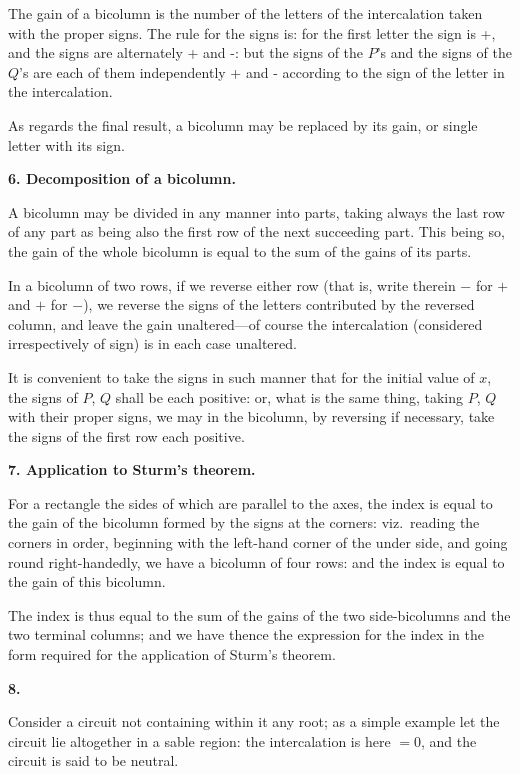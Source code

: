 \documentclass[12pt,a4paper]{article}
\theoremstyle{plain}
\theoremstyle{definition}
\begin{document}
The gain of a bicolumn is the number of the letters of the intercalation taken with the proper signs. The rule for the signs is: for the first letter the sign is +, and the signs are alternately + and -: but the signs of the $P$'s and the signs of the $Q$'s are each of them independently + and - according to the sign of the letter in the intercalation.

As regards the final result, a bicolumn may be replaced by its gain, or single letter with its sign.

\textbf{6. Decomposition of a bicolumn.}

A bicolumn may be divided in any manner into parts, taking always the last row of any part as being also the first row of the next succeeding part. This being so, the gain of the whole bicolumn is equal to the sum of the gains of its parts.

In a bicolumn of two rows, if we reverse either row (that is, write therein $-$ for $+$ and $+$ for $-$), we reverse the signs of the letters contributed by the reversed column, and leave the gain unaltered---of course the intercalation (considered irrespectively of sign) is in each case unaltered.

It is convenient to take the signs in such manner that for the initial value of $x$, the signs of $P$, $Q$ shall be each positive: or, what is the same thing, taking $P$, $Q$ with their proper signs, we may in the bicolumn, by reversing if necessary, take the signs of the first row each positive.

\textbf{7. Application to Sturm's theorem.}

For a rectangle the sides of which are parallel to the axes, the index is equal to the gain of the bicolumn formed by the signs at the corners: viz.\ reading the corners in order, beginning with the left-hand corner of the under side, and going round right-handedly, we have a bicolumn of four rows: and the index is equal to the gain of this bicolumn.

\newpage
\setcounter{page}{24}

The index is thus equal to the sum of the gains of the two side-bicolumns and the two terminal columns; and we have thence the expression for the index in the form required for the application of Sturm's theorem.

\textbf{8.}

Consider a circuit not containing within it any root; as a simple example let the circuit lie altogether in a sable region: the intercalation is here $= 0$, and the circuit is said to be neutral.
\end{document}

